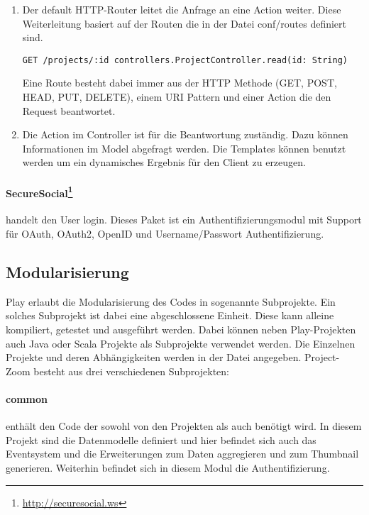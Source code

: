 \begin{enumerate}
  \item Der default HTTP-Router leitet die Anfrage an eine Action weiter. Diese Weiterleitung basiert auf der Routen die in der Datei conf/routes definiert sind.
\begin{lstlisting}
GET /projects/:id controllers.ProjectController.read(id: String)
\end{lstlisting}
Eine Route besteht dabei immer aus der HTTP Methode (GET, POST, HEAD, PUT, DELETE)\cite{play-scala-routing}, einem URI Pattern und einer Action die den Request beantwortet.
\item Die Action im Controller ist für die Beantwortung zuständig. Dazu können Informationen im Model abgefragt werden. Die Templates können benutzt werden um ein dynamisches Ergebnis für den Client zu erzeugen.
\end{enumerate}

\paragraph{SecureSocial\footnote{\url{http://securesocial.ws}}} handelt den User login. Dieses Paket ist ein Authentifizierungsmodul mit Support für OAuth, OAuth2, OpenID und Username/Passwort Authentifizierung. 

\subsection{Modularisierung}
Play erlaubt die Modularisierung des Codes in sogenannte Subprojekte. Ein solches Subprojekt ist dabei eine abgeschlossene Einheit. Diese kann alleine kompiliert, getestet und ausgeführt werden. Dabei können neben Play-Projekten auch Java oder Scala Projekte als Subprojekte verwendet werden. Die Einzelnen Projekte und deren Abhängigkeiten werden in der  Datei angegeben.
Project-Zoom besteht aus drei verschiedenen Subprojekten:

\paragraph{common} enthält den Code der sowohl von den Projekten  als auch  benötigt wird. In diesem Projekt sind die Datenmodelle definiert und hier befindet sich auch das Eventsystem und die Erweiterungen zum Daten aggregieren und zum Thumbnail generieren. Weiterhin befindet sich in diesem Modul die Authentifizierung.

